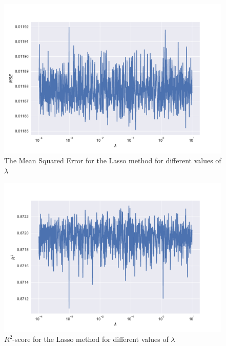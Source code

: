 \documentclass[a4paper,10pt,english]{article}
\begin{document}

\begin{figure}[H]
	\centering 
	\includegraphics[scale=0.6]{part_e_reg_MSE.pdf}
	\caption{The Mean Squared Error for the Lasso method for different values of $\lambda$}
	\label{part_e_MSE}
\end{figure}

\begin{figure}[H]
	\centering 
	\includegraphics[scale=0.6]{part_e_reg_R2.pdf}
	\caption{$R^2$-score for the Lasso method for different values of $\lambda$}
	\label{part_e_R2}
\end{figure}
\end{document}
